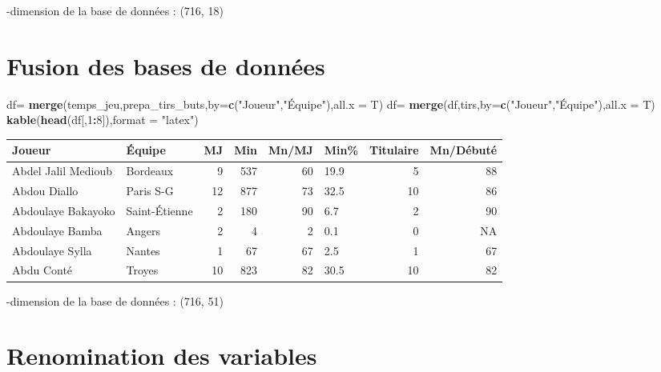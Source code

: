 \documentclass[7pt,]{report}
\newenvironment{Shaded}{\begin{snugshade}}{\end{snugshade}}
\newcommand{\DataTypeTok}[1]{\textcolor[rgb]{0.13,0.29,0.53}{#1}}
\newcommand{\DecValTok}[1]{\textcolor[rgb]{0.00,0.00,0.81}{#1}}
\newcommand{\KeywordTok}[1]{\textcolor[rgb]{0.13,0.29,0.53}{\textbf{#1}}}
\newcommand{\NormalTok}[1]{#1}
\newcommand{\OperatorTok}[1]{\textcolor[rgb]{0.81,0.36,0.00}{\textbf{#1}}}
\newcommand{\StringTok}[1]{\textcolor[rgb]{0.31,0.60,0.02}{#1}}
\begin{document}
-dimension de la base de données : (716, 18)

\hypertarget{fusion-des-bases-de-donnuxe9es}{%
\section{Fusion des bases de données}\label{fusion-des-bases-de-donnuxe9es}}

\begin{Shaded}
\begin{Highlighting}[]
\NormalTok{df=}\StringTok{ }\KeywordTok{merge}\NormalTok{(temps_jeu,prepa_tirs_buts,}\DataTypeTok{by=}\KeywordTok{c}\NormalTok{(}\StringTok{"Joueur"}\NormalTok{,}\StringTok{"Équipe"}\NormalTok{),}\DataTypeTok{all.x =}\NormalTok{ T)}
\NormalTok{df=}\StringTok{ }\KeywordTok{merge}\NormalTok{(df,tirs,}\DataTypeTok{by=}\KeywordTok{c}\NormalTok{(}\StringTok{"Joueur"}\NormalTok{,}\StringTok{"Équipe"}\NormalTok{),}\DataTypeTok{all.x =}\NormalTok{ T)}
\KeywordTok{kable}\NormalTok{(}\KeywordTok{head}\NormalTok{(df[,}\DecValTok{1}\OperatorTok{:}\DecValTok{8}\NormalTok{]),}\DataTypeTok{format =} \StringTok{"latex"}\NormalTok{)}
\end{Highlighting}
\end{Shaded}

\begin{tabular}{l|l|r|r|r|l|r|r}
\hline
Joueur & Équipe & MJ & Min & Mn/MJ & Min\% & Titulaire & Mn/Débuté\\
\hline
Abdel Jalil Medioub & Bordeaux & 9 & 537 & 60 & 19.9 & 5 & 88\\
\hline
Abdou Diallo & Paris S-G & 12 & 877 & 73 & 32.5 & 10 & 86\\
\hline
Abdoulaye Bakayoko & Saint-Étienne & 2 & 180 & 90 & 6.7 & 2 & 90\\
\hline
Abdoulaye Bamba & Angers & 2 & 4 & 2 & 0.1 & 0 & NA\\
\hline
Abdoulaye Sylla & Nantes & 1 & 67 & 67 & 2.5 & 1 & 67\\
\hline
Abdu Conté & Troyes & 10 & 823 & 82 & 30.5 & 10 & 82\\
\hline
\end{tabular}

-dimension de la base de données : (716, 51)

\hypertarget{renomination-des-variables}{%
\section{Renomination des variables}\label{renomination-des-variables}}
\end{document}
